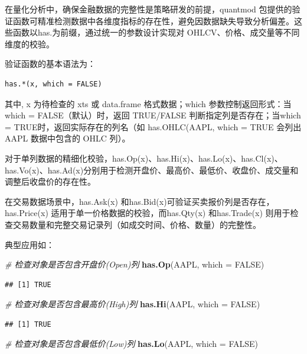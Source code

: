 \documentclass[]{ctexbook}
\newenvironment{Shaded}{\begin{snugshade}}{\end{snugshade}}
\newcommand{\AttributeTok}[1]{\textcolor[rgb]{0.13,0.29,0.53}{#1}}
\newcommand{\CommentTok}[1]{\textcolor[rgb]{0.56,0.35,0.01}{\textit{#1}}}
\newcommand{\ConstantTok}[1]{\textcolor[rgb]{0.56,0.35,0.01}{#1}}
\newcommand{\FunctionTok}[1]{\textcolor[rgb]{0.13,0.29,0.53}{\textbf{#1}}}
\newcommand{\NormalTok}[1]{#1}
\begin{document}
在量化分析中，确保金融数据的完整性是策略研发的前提，quantmod 包提供的验证函数可精准检测数据中各维度指标的存在性，避免因数据缺失导致分析偏差。这些函数以has.为前缀，通过统一的参数设计实现对 OHLCV、价格、成交量等不同维度的校验。

验证函数的基本语法为：

\begin{verbatim}
has.*(x, which = FALSE) 
\end{verbatim}

其中, x 为待检查的 xts 或 data.frame 格式数据；which 参数控制返回形式：当 which = FALSE（默认）时，返回 TRUE/FALSE 判断指定列是否存在；当which = TRUE时，返回实际存在的列名（如 has.OHLC(AAPL, which = TRUE 会列出 AAPL 数据中包含的 OHLC 列）。

对于单列数据的精细化校验，has.Op(x)、has.Hi(x)、has.Lo(x)、has.Cl(x)、has.Vo(x)、has.Ad(x)分别用于检测开盘价、最高价、最低价、收盘价、成交量和调整后收盘价的存在性。

在交易数据场景中，has.Ask(x) 和has.Bid(x)可验证买卖报价列是否存在，has.Price(x) 适用于单一价格数据的校验，而has.Qty(x) 和has.Trade(x) 则用于检查交易数量和完整交易记录列（如成交时间、价格、数量）的完整性。

典型应用如：

\begin{Shaded}
\begin{Highlighting}[]
\CommentTok{\# 检查对象是否包含开盘价(Open)列}
\FunctionTok{has.Op}\NormalTok{(AAPL, }\AttributeTok{which =} \ConstantTok{FALSE}\NormalTok{)}
\end{Highlighting}
\end{Shaded}

\begin{verbatim}
## [1] TRUE
\end{verbatim}

\begin{Shaded}
\begin{Highlighting}[]
\CommentTok{\# 检查对象是否包含最高价(High)列}
\FunctionTok{has.Hi}\NormalTok{(AAPL, }\AttributeTok{which =} \ConstantTok{FALSE}\NormalTok{)}
\end{Highlighting}
\end{Shaded}

\begin{verbatim}
## [1] TRUE
\end{verbatim}

\begin{Shaded}
\begin{Highlighting}[]
\CommentTok{\# 检查对象是否包含最低价(Low)列}
\FunctionTok{has.Lo}\NormalTok{(AAPL, }\AttributeTok{which =} \ConstantTok{FALSE}\NormalTok{)}
\end{Highlighting}
\end{Shaded}
\end{document}
